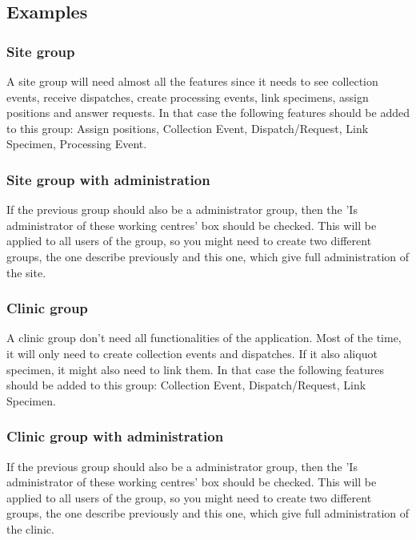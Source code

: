 \subsection{Examples}

\subsubsection{Site group}

A site group will need almost all the features since it needs to see collection events, receive dispatches, create processing events, link specimens, assign positions and answer requests.
In that case the following features should be added to this group: Assign positions, Collection Event, Dispatch/Request, Link Specimen, Processing Event.

\subsubsection{Site group with administration}

If the previous group should also be a administrator group, then the 'Is administrator of these working centres' box should be checked. This will be applied to all users of the group, so you might need to create two different groups, the one describe previously and this one, which give full administration of the site.

\subsubsection{Clinic group}

A clinic group don't need all functionalities of the application. Most of the time, it will only need to create collection events and dispatches. If it also aliquot specimen, it might also need to link them.
In that case the following features should be added to this group: Collection Event, Dispatch/Request, Link Specimen.

\subsubsection{Clinic group with administration}

If the previous group should also be a administrator group, then the 'Is administrator of these working centres' box should be checked. This will be applied to all users of the group, so you might need to create two different groups, the one describe previously and this one, which give full administration of the clinic.

